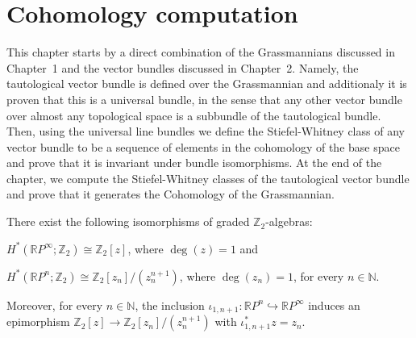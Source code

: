 \chapter{Cohomology computation}\label{chap:cohomology}
This chapter starts by a direct combination of the Grassmannians discussed in Chapter~1 and the vector bundles discussed in Chapter~2. Namely, the tautological vector bundle is defined over the Grassmannian and additionaly it is proven that this is a universal bundle, in the sense that any other vector bundle over almost any topological space is a subbundle of the tautological bundle. Then, using the universal line bundles we define the Stiefel-Whitney class of any vector bundle to be a sequence of elements in the cohomology of the base space and prove that it is invariant under bundle isomorphisms. At the end of the chapter, we compute the Stiefel-Whitney classes of the tautological vector bundle and prove that it generates the Cohomology of the Grassmannian.

\begin{theorem}\label{thm:projective_spaces_cohomology} There exist the following isomorphisms of graded $\mathbb{Z}_2$-algebras:
\begin{b_item}
\item $H^*(\mathbb{R}P^{\infty};\mathbb{Z}_2)\cong\mathbb{Z}_2[z]$, where $\deg(z)=1$ and
\item $H^*(\mathbb{R}P^n;\mathbb{Z}_2)\cong\mathbb{Z}_2[z_n]/(z_n^{n+1})$, where $\deg(z_n)=1$, for every $n\in\mathbb{N}$.
\end{b_item}
Moreover, for every $n\in\mathbb{N}$, the inclusion $\iota_{1,n+1}:\mathbb{R}P^n\hookrightarrow\mathbb{R}P^{\infty}$ induces an epimorphism $\mathbb{Z}_2[z]\to\mathbb{Z}_2[z_n]/(z_n^{n+1})$ with $\iota_{1,n+1}^*z=z_n$.
\end{theorem}

